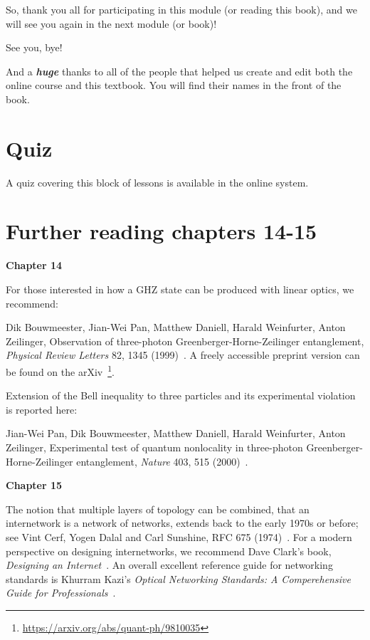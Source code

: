 So, thank you all for participating in this module (or reading this book), and we will see you again in the next module (or book)!

\mmm See you, bye!

And a \textbf{\emph{huge}} thanks to all of the people that helped us create and edit both the online course and this textbook. You will find their names in the front of the book.



\newpage
\section*{Quiz}

A quiz covering this block of lessons is available in the online system.


\section*{Further reading chapters 14-15}

{\bf Chapter 14}

For those interested in how a GHZ state can be produced with linear optics, we recommend:

Dik Bouwmeester, Jian-Wei Pan, Matthew Daniell, Harald Weinfurter, Anton Zeilinger, Observation of three-photon Greenberger-Horne-Zeilinger entanglement, \emph{Physical Review Letters} 82, 1345 (1999)~\cite{bouwmeester:ghz}.
A freely accessible preprint version can be found on the arXiv~\footnote{\url{https://arxiv.org/abs/quant-ph/9810035}}.

Extension of the Bell inequality to three particles and its experimental violation is reported here:

Jian-Wei Pan, Dik Bouwmeester, Matthew Daniell, Harald Weinfurter, Anton Zeilinger, Experimental test of quantum nonlocality in three-photon Greenberger-Horne-Zeilinger entanglement, \emph{Nature} 403, 515 (2000)~\cite{pan2000experimental}.


{\bf Chapter 15}

The notion that multiple layers of topology can be combined, that an internetwork is a network of networks, extends back to the early 1970s or before; see Vint Cerf, Yogen Dalal and Carl Sunshine, RFC 675 (1974)~\cite{RFC0675}.  For a modern perspective on designing internetworks, we recommend Dave Clark's book, \emph{Designing an Internet}~\cite{clark2018designing}.
An overall excellent reference guide for networking standards is Khurram Kazi's \emph{Optical Networking Standards: A Comperehensive Guide for Professionals}~\cite{kazi2007optical}.

